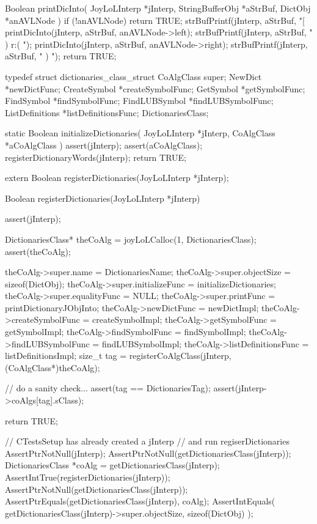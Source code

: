 Boolean printDicInto(
  JoyLoLInterp    *jInterp,
  StringBufferObj *aStrBuf,
  DictObj         *anAVLNode
) {
  if (!anAVLNode) return TRUE;
  strBufPrintf(jInterp, aStrBuf, "[%
  printDicInto(jInterp, aStrBuf, anAVLNode->left);
  strBufPrintf(jInterp, aStrBuf, " ) r:( ");
  printDicInto(jInterp, aStrBuf, anAVLNode->right);
  strBufPrintf(jInterp, aStrBuf, " ) ");
  return TRUE;
}
\stopCCode

\startTestSuite[registerDictionaries]

\startCHeader
typedef struct dictionaries_class_struct {
  CoAlgClass super;
  NewDict         *newDictFunc;
  CreateSymbol    *createSymbolFunc;
  GetSymbol       *getSymbolFunc;
  FindSymbol      *findSymbolFunc;
  FindLUBSymbol   *findLUBSymbolFunc;
  ListDefinitions *listDefinitionsFunc;
} DictionariesClass;
\stopCHeader

\startCCode
static Boolean initializeDictionaries(
  JoyLoLInterp *jInterp,
  CoAlgClass   *aCoAlgClass
) {
  assert(jInterp);
  assert(aCoAlgClass);
  registerDictionaryWords(jInterp);
  return TRUE;
}
\stopCCode

\startCHeader
extern Boolean registerDictionaries(JoyLoLInterp *jInterp);
\stopCHeader
{}

\startCCode
Boolean registerDictionaries(JoyLoLInterp *jInterp) {
  assert(jInterp);
  
  DictionariesClass* theCoAlg =
    joyLoLCalloc(1, DictionariesClass);
  assert(theCoAlg);
  
  theCoAlg->super.name            = DictionariesName;
  theCoAlg->super.objectSize      = sizeof(DictObj);
  theCoAlg->super.initializeFunc  = initializeDictionaries;
  theCoAlg->super.equalityFunc    = NULL;
  theCoAlg->super.printFunc       = printDictionaryJObjInto;
  theCoAlg->newDictFunc           = newDictImpl;
  theCoAlg->createSymbolFunc      = createSymbolImpl;
  theCoAlg->getSymbolFunc         = getSymbolImpl;
  theCoAlg->findSymbolFunc        = findSymbolImpl;
  theCoAlg->findLUBSymbolFunc     = findLUBSymbolImpl;
  theCoAlg->listDefinitionsFunc   = listDefinitionsImpl;
  size_t tag =
    registerCoAlgClass(jInterp, (CoAlgClass*)theCoAlg);
  
  // do a sanity check...
  assert(tag == DictionariesTag);
  assert(jInterp->coAlgs[tag].sClass);
    
  return TRUE;
}
\stopCCode


\startCTest
  // CTestsSetup has already created a jInterp
  // and run regiserDictionaries
  AssertPtrNotNull(jInterp);
  AssertPtrNotNull(getDictionariesClass(jInterp));
  DictionariesClass *coAlg =
    getDictionariesClass(jInterp);
  AssertIntTrue(registerDictionaries(jInterp));
  AssertPtrNotNull(getDictionariesClass(jInterp));
  AssertPtrEquals(getDictionariesClass(jInterp), coAlg);
  AssertIntEquals(
    getDictionariesClass(jInterp)->super.objectSize, 
    sizeof(DictObj)
  );
\stopCTest
\stopTestCase
\stopTestSuite

